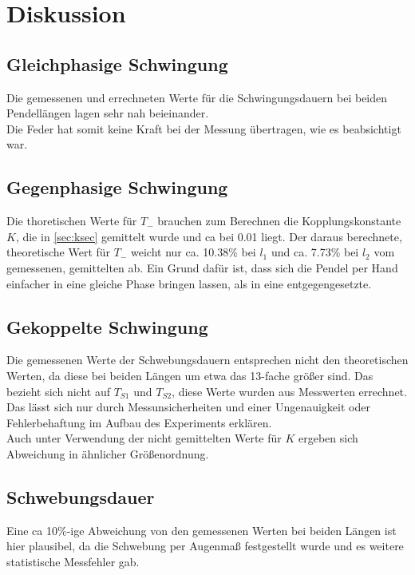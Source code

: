 \section{Diskussion}
\label{sec:Diskussion}

\subsection{Gleichphasige Schwingung}
Die gemessenen und errechneten Werte für die Schwingungsdauern bei beiden Pendellängen lagen sehr nah beieinander.\\
Die Feder hat somit keine Kraft bei der Messung übertragen, wie es beabsichtigt war.
\subsection{Gegenphasige Schwingung}
Die thoretischen Werte für $T_-$ brauchen zum Berechnen die Kopplungskonstante $K$, die in \autoref{sec:ksec} gemittelt wurde und ca bei 0.01 liegt.
Der daraus berechnete, theoretische Wert für $T_-$ weicht nur ca. 10.38\% bei $l_1$ und ca. 7.73\% bei $l_2$ vom gemessenen, gemittelten ab.
Ein Grund dafür ist, dass sich die Pendel per Hand einfacher in eine gleiche Phase bringen lassen, als in eine entgegengesetzte.
\subsection{Gekoppelte Schwingung}
Die gemessenen Werte der Schwebungsdauern entsprechen nicht den theoretischen Werten, da diese bei beiden Längen um etwa das 13-fache größer sind.
Das bezieht sich nicht auf $T_{S1}$ und $T_{S2}$, diese Werte wurden aus Messwerten errechnet.
Das lässt sich nur durch Messunsicherheiten und einer Ungenauigkeit oder Fehlerbehaftung im Aufbau des Experiments erklären.\\
Auch unter Verwendung der nicht gemittelten Werte für $K$ ergeben sich Abweichung in ähnlicher Größenordnung.
\subsection{Schwebungsdauer}
Eine ca 10\%-ige Abweichung von den gemessenen Werten bei beiden Längen ist hier plausibel, da die Schwebung per Augenmaß festgestellt wurde und es weitere statistische Messfehler gab.